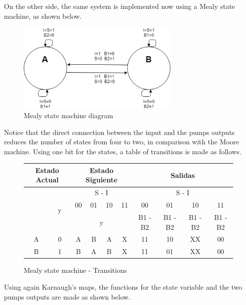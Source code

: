 On the other side, the same system is implemented 
now using a Mealy state machine, as shown below.

\begin{figure}[H]
    \begin{centering}
    \includegraphics[width=0.7\textwidth]{Graficos1/1b_fsm.png}
    \par\end{centering}
    \caption{Mealy state machine diagram}
\end{figure}

Notice that the direct connection between the 
input and the pumps outputs reduces the number 
of states from four to two, in comparison with 
the Moore machine.
Using one bit for the states, a table of transitions
is made as follows.

\begin{figure}[H]
\begin{centering}
\begin{tabular}{|c|c|c|c|c|c||c|c|c|c|}
    \hline 
    \multicolumn{2}{|c|}{Estado Actual} & \multicolumn{4}{c||}{Estado Siguiente} & \multicolumn{4}{c|}{Salidas}\tabularnewline
    \hline 
    \hline 
    \multirow{3}{*}{} & \multirow{3}{*}{y} & \multicolumn{4}{c||}{S - I} & \multicolumn{4}{c|}{S - I}\tabularnewline
    \cline{3-10} 
     &  & 00 & 01 & 10 & 11 & 00 & 01 & 10 & 11\tabularnewline
    \cline{3-10} 
     &  & \multicolumn{4}{c||}{y} & B1 - B2 & B1 - B2 & B1 - B2 & B1 - B2\tabularnewline
    \hline 
    A & 0 & A & B & A & X & 11 & 10 & XX & 00\tabularnewline
    \hline 
    B & 1 & B & A & B & X & 11 & 01 & XX & 00\tabularnewline
    \hline 
    \end{tabular}
    \caption{Mealy state machine - Transitions}
\end{centering}
\end{figure}

Using again Karnaugh's maps, the functions for
the state variable and the two pumps outputs are
made as shown below.

